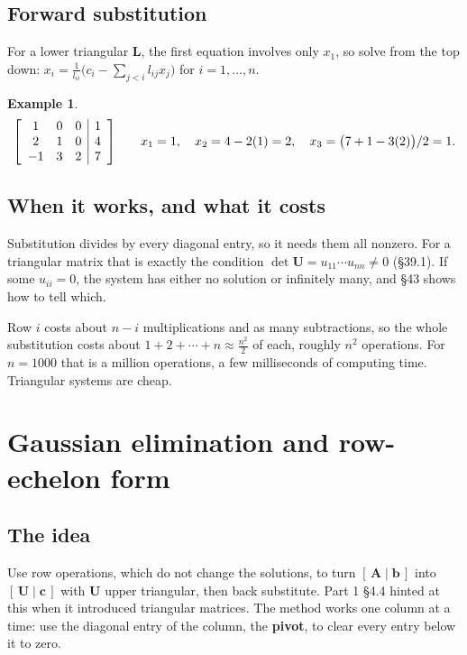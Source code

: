 \documentclass[11pt]{article}
\theoremstyle{plain}
\theoremstyle{definition}
\newtheorem{ex}{Example}[section]
\theoremstyle{remark}
\newcommand{\vc}[1]{\mathbf{#1}}
\newcommand{\mt}[1]{\mathbf{#1}}
\newenvironment{aug}[1]{\left[\begin{array}{#1}}{\end{array}\right]}
\begin{document}
\subsection{Forward substitution}
For a lower triangular $\mt{L}$, the first equation involves only $x_1$, so solve
from the top down:
$x_i=\frac{1}{l_{ii}}\bigl(c_i-\sum_{j<i}l_{ij}x_j\bigr)$ for $i=1,\dots,n$.

\begin{ex}
\[
  \begin{aug}{ccc|c}1&0&0&1\\2&1&0&4\\-1&3&2&7\end{aug}
  \qquad
  x_1=1,\quad x_2=4-2(1)=2,\quad x_3=\bigl(7+1-3(2)\bigr)/2=1 .
\]
\end{ex}

\subsection{When it works, and what it costs}
Substitution divides by every diagonal entry, so it needs them all nonzero. For a
triangular matrix that is exactly the condition $\det\mt{U}=u_{11}\cdots u_{nn}\neq0$
(\S39.1). If some $u_{ii}=0$, the system has either no solution or infinitely
many, and \S43 shows how to tell which.

Row $i$ costs about $n-i$ multiplications and as many subtractions, so the whole
substitution costs about $1+2+\cdots+n\approx\frac{n^{2}}{2}$ of each, roughly
$n^{2}$ operations. For $n=1000$ that is a million operations, a few
milliseconds of computing time. Triangular systems are cheap.

\section{Gaussian elimination and row-echelon form}

\subsection{The idea}
Use row operations, which do not change the solutions, to turn $[\,\mt{A}\mid\vc{b}\,]$
into $[\,\mt{U}\mid\vc{c}\,]$ with $\mt{U}$ upper triangular, then back
substitute. Part 1 \S4.4 hinted at this when it introduced triangular matrices.
The method works one column at a time: use the diagonal entry of the column, the
\textbf{pivot}, to clear every entry below it to zero.
\end{document}
